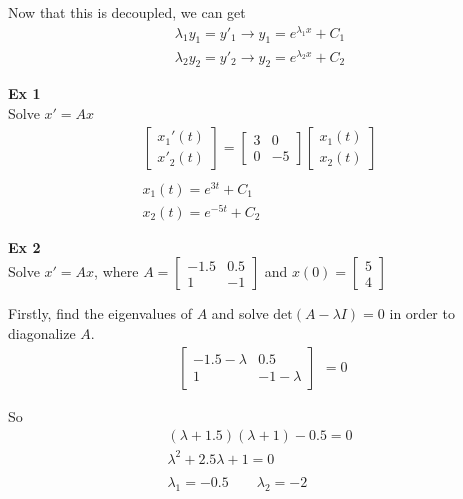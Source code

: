 \documentclass{article}
\begin{document}
    Now that this is decoupled, we can get
    \[
        \begin{gathered}
            \lambda_1 y_1=y'_1 \to y_1=e^{\lambda_1 x}+C_1\\
            \lambda_2 y_2=y'_2 \to y_2=e^{\lambda_2 x}+C_2 
        \end{gathered}
    \]

    \textbf{Ex 1}\\
    Solve $ x'=Ax $
    \[
        \begin{gathered}
        \begin{bmatrix}
            x_1'(t)\\
            x'_2(t)
        \end{bmatrix}=
        \begin{bmatrix}
            3 &0\\
            0 &-5
        \end{bmatrix}
        \begin{bmatrix}
            x_1(t)\\
            x_2(t)
        \end{bmatrix}\\
        ~\\
        x_1(t)=e^{3t}+C_1\\
        x_2(t)=e^{-5t}+C_2  
        \end{gathered}
    \]

    \textbf{Ex 2}\\
    Solve $ x'=Ax $, where $ A=\begin{bmatrix}
        -1.5 &0.5\\
        1 &-1
    \end{bmatrix} $ and $ x(0)=\begin{bmatrix}
        5\\
        4
    \end{bmatrix} $ 

    Firstly, find the eigenvalues of $ A $ and solve $ \text{det}(A-\lambda I) =0$ in order to diagonalize $ A $.
    \[
        \begin{gathered}
        \begin{bmatrix}
        -1.5 - \lambda &0.5\\
        1 &-1-\lambda
        \end{bmatrix}
        \end{gathered}=0
    \]

    So
    \[
        \begin{gathered}
          (\lambda + 1.5)(\lambda + 1)-0.5=0\\
          \lambda^{2} + 2.5\lambda + 1=0\\
          ~\\
          \lambda_1 = -0.5 \qquad \lambda_2 = -2 
        \end{gathered}
    \]
\end{document}
